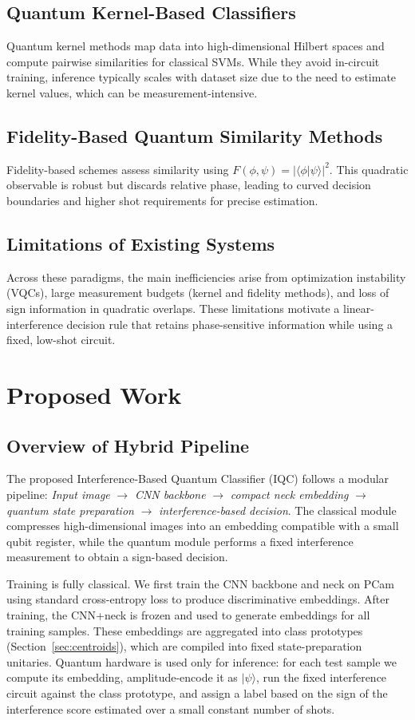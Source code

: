 \documentclass[conference]{IEEEtran}
\begin{document}
\subsection{Quantum Kernel-Based Classifiers}
Quantum kernel methods map data into high-dimensional Hilbert spaces and compute pairwise similarities for classical SVMs. While they avoid in-circuit training, inference typically scales with dataset size due to the need to estimate kernel values, which can be measurement-intensive.

\subsection{Fidelity-Based Quantum Similarity Methods}
Fidelity-based schemes assess similarity using $F(\phi, \psi) = |\langle \phi | \psi \rangle|^2$. This quadratic observable is robust but discards relative phase, leading to curved decision boundaries and higher shot requirements for precise estimation.

\subsection{Limitations of Existing Systems}
Across these paradigms, the main inefficiencies arise from optimization instability (VQCs), large measurement budgets (kernel and fidelity methods), and loss of sign information in quadratic overlaps. These limitations motivate a linear-interference decision rule that retains phase-sensitive information while using a fixed, low-shot circuit.

\section{Proposed Work}

\subsection{Overview of Hybrid Pipeline}
The proposed Interference-Based Quantum Classifier (IQC) follows a modular pipeline: \emph{Input image} $\rightarrow$ \emph{CNN backbone} $\rightarrow$ \emph{compact neck embedding} $\rightarrow$ \emph{quantum state preparation} $\rightarrow$ \emph{interference-based decision}. The classical module compresses high-dimensional images into an embedding compatible with a small qubit register, while the quantum module performs a fixed interference measurement to obtain a sign-based decision.

Training is fully classical. We first train the CNN backbone and neck on PCam using standard cross-entropy loss to produce discriminative embeddings. After training, the CNN+neck is frozen and used to generate embeddings for all training samples. These embeddings are aggregated into class prototypes (Section~\ref{sec:centroids}), which are compiled into fixed state-preparation unitaries. Quantum hardware is used only for inference: for each test sample we compute its embedding, amplitude-encode it as $|\psi\rangle$, run the fixed interference circuit against the class prototype, and assign a label based on the sign of the interference score estimated over a small constant number of shots.
\end{document}
